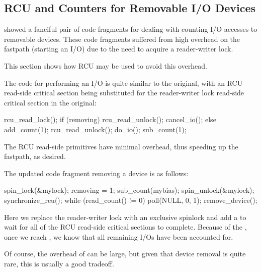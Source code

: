 \subsection{RCU and Counters for Removable I/O Devices}
\label{sec:together:RCU and Counters for Removable I/O Devices}

showed a fanciful pair of code fragments for dealing with counting
I/O accesses to removable devices.
These code fragments suffered from high overhead on the fastpath
(starting an I/O) due to the need to acquire a reader-writer
lock.

This section shows how RCU may be used to avoid this overhead.

The code for performing an I/O is quite similar to the original, with
an RCU read-side critical section being substituted for the reader-writer
lock read-side critical section in the original:

\begin{VerbatimN}[tabsize=8]
rcu_read_lock();
if (removing) {
	rcu_read_unlock();
	cancel_io();
} else {
	add_count(1);
	rcu_read_unlock();
	do_io();
	sub_count(1);
}
\end{VerbatimN}
\vspace{5pt}

The RCU read-side primitives have minimal overhead, thus speeding up
the fastpath, as desired.

The updated code fragment removing a device is as follows:

\begin{fcvlabel}
\begin{VerbatimN}[tabsize=8,commandchars=\\\[\]]
spin_lock(&mylock);
removing = 1;
sub_count(mybias);
spin_unlock(&mylock);
synchronize_rcu();
while (read_count() != 0) {	\lnlbl[nextofsync]
	poll(NULL, 0, 1);
}
remove_device();
\end{VerbatimN}
\end{fcvlabel}

\begin{fcvref}
Here we replace the reader-writer lock with an exclusive spinlock and
add a  to wait for all of the RCU read-side
critical sections to complete.
Because of the ,
once we reach ,
we know that all remaining I/Os have been accounted for.

Of course, the overhead of  can be large,
but given that device removal is quite rare, this is usually a good
tradeoff.
\end{fcvref}

